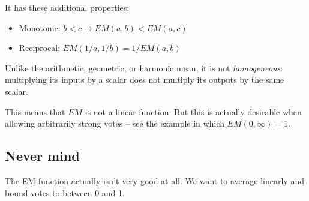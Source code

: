 \documentclass{article}
\begin{document}
It has these additional properties:
\begin{itemize}
\item Monotonic: $b < c \rightarrow EM(a, b) < EM(a, c)$
\item Reciprocal: $EM(1/a, 1/b) = 1/EM(a, b)$
\end{itemize}

Unlike the arithmetic, geometric, or harmonic mean, it is not {\em
homogeneous}: multiplying its inputs by a scalar does not multiply its outputs
by the same scalar.

This means that $EM$ is not a linear function. But this is actually desirable
when allowing arbitrarily strong votes -- see the example in which $EM(0,
\infty) = 1$.

\subsection{Never mind}
The EM function actually isn't very good at all. We want to average linearly
and bound votes to between 0 and 1.



\end{document}
